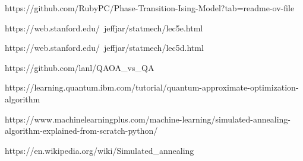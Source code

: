 https://github.com/RubyPC/Phase-Transition-Ising-Model?tab=readme-ov-file

https://web.stanford.edu/~jeffjar/statmech/lec5e.html

https://web.stanford.edu/~jeffjar/statmech/lec5d.html

https://github.com/lanl/QAOA_vs_QA

https://learning.quantum.ibm.com/tutorial/quantum-approximate-optimization-algorithm

https://www.machinelearningplus.com/machine-learning/simulated-annealing-algorithm-explained-from-scratch-python/

https://en.wikipedia.org/wiki/Simulated_annealing

